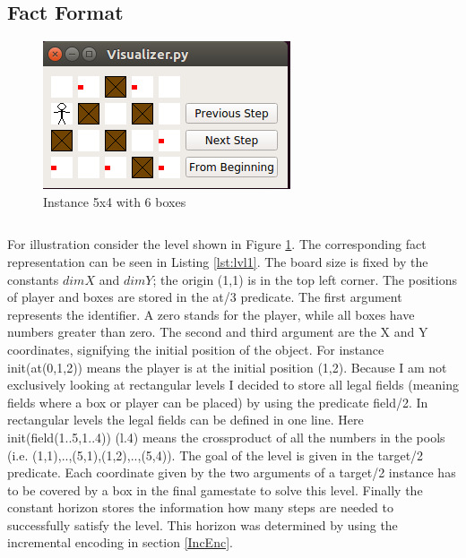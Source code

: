 \documentclass{report}
\begin{document}
\subsection{Fact Format}
\begin{figure}[ht]
\centering
\includegraphics{Visualizer}
\caption{Instance 5x4 with 6 boxes}
\label{fig:levelVis}
\end{figure}

\begin{lstlisting}[caption={Fact Format of my third level},label=lst:lvl1]
\end{lstlisting}
For illustration consider the level shown in Figure \ref{fig:levelVis}. The corresponding fact representation can be seen in Listing \ref{lst:lvl1}. The board size is fixed by the constants $dimX$ and $dimY$; the origin (1,1) is in the top left corner. The positions of player and boxes are stored in the at/3 predicate. The first argument represents the identifier. A zero stands for the player, while all boxes have numbers greater than zero. The second and third argument are the X and Y coordinates, signifying the initial position of the object. For instance init(at(0,1,2)) means the player is at the initial position (1,2). Because I am not exclusively looking at rectangular levels I decided to store all legal fields (meaning fields where a box or player can be placed) by using the predicate field/2. In rectangular levels the legal fields can be defined in one line. Here init(field(1..5,1..4)) (l.4) means the crossproduct of all the numbers in the pools (i.e. (1,1),..,(5,1),(1,2),..,(5,4)).
The goal of the level is given in the target/2 predicate. Each coordinate given by the two arguments of a target/2 instance has to be covered by a box in the final gamestate to solve this level.
Finally the constant horizon stores the information how many steps are needed to successfully satisfy the level. This horizon was determined by using the incremental encoding in section \ref{IncEnc}.
\end{document}
